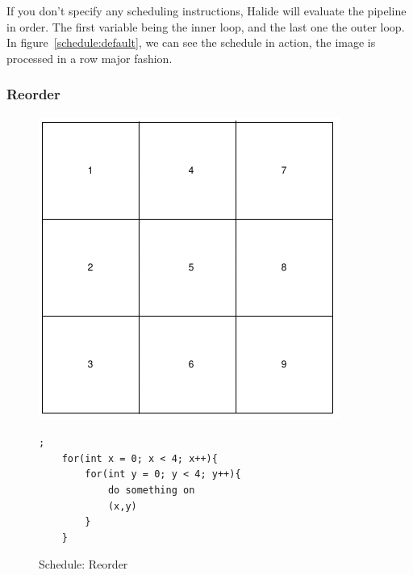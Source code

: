 	If you don't specify any scheduling instructions, Halide will evaluate the pipeline in order. The first variable being the inner loop, and the last one the outer loop. In figure~\ref{schedule:default}, we can see the schedule in action, the image is processed in a row major fashion.

	\subsubsection{Reorder}


\begin{figure}[H]

		\begin{minipage}[c]{\EIW}
			\centering
		\includegraphics[width=\textwidth]{Images/Reorder.png}
		\end{minipage}
		\begin{minipage}[c]{\ECW}
			\centering
\begin{lstlisting}[label={code:reorder}];
	for(int x = 0; x < 4; x++){
		for(int y = 0; y < 4; y++){
			do something on
			(x,y)
		}
	}
\end{lstlisting}
		\end{minipage}
		\caption{Schedule: Reorder}
		\label{schedule:reorder}
\end{figure}



